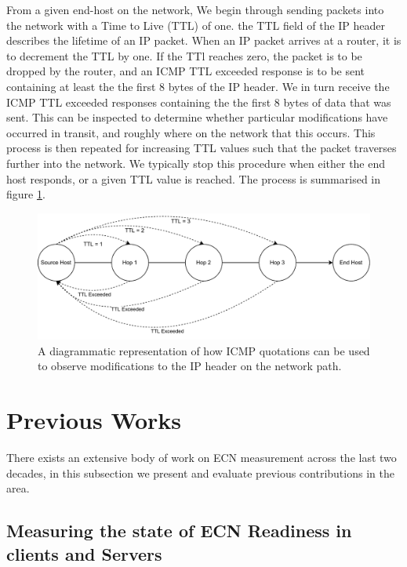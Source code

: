\documentclass{l4proj}
\begin{document}
From a given end-host on the network, We begin through sending packets into the network with a Time to Live (TTL) of one. the TTL field of the IP header describes the lifetime of an IP packet. When an IP packet arrives at a router, it is to decrement the TTL by one. If the TTl reaches zero, the packet is to be dropped by the router, and an ICMP TTL exceeded response is to be sent containing at least the the first 8 bytes of the IP header. We in turn receive the ICMP TTL exceeded responses containing the the first 8 bytes of data that was sent. This can be inspected to determine whether particular modifications have occurred in transit, and roughly where on the network that this occurs. This process is then repeated for increasing TTL values such that the packet traverses further into the network. We typically stop this procedure when either the end host responds, or a given TTL value is reached. The process is summarised in figure \ref{fig:icmp}.

\begin{figure}[h!]

\centering
\includegraphics[width=14cm,keepaspectratio]{dissertation/images/icmp.pdf}
\caption{A diagrammatic representation of how ICMP quotations can be used to observe modifications to the IP header on the network path.}
\label{fig:icmp}
\end{figure}

\section{Previous Works}

There exists an extensive body of work on ECN measurement across the last two decades, in this subsection we present and evaluate previous contributions in the area.

\subsection{Measuring the state of ECN Readiness in clients and Servers}
\end{document}
